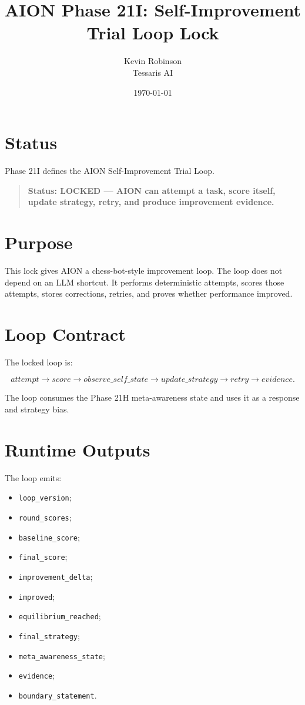 \documentclass[11pt,a4paper]{article}
\title{\textbf{AION Phase 21I: Self-Improvement Trial Loop Lock}}
\author{Kevin Robinson\\Tessaris AI}
\date{\today}
\begin{document}
\maketitle

\section{Status}

Phase 21I defines the AION Self-Improvement Trial Loop.

\begin{quote}
\textbf{Status: LOCKED --- AION can attempt a task, score itself, update strategy, retry, and produce improvement evidence.}
\end{quote}

\section{Purpose}

This lock gives AION a chess-bot-style improvement loop. The loop does not depend on an LLM shortcut. It performs deterministic attempts, scores those attempts, stores corrections, retries, and proves whether performance improved.

\section{Loop Contract}

The locked loop is:

\[
attempt \rightarrow score \rightarrow observe\_self\_state \rightarrow update\_strategy \rightarrow retry \rightarrow evidence.
\]

The loop consumes the Phase 21H meta-awareness state and uses it as a response and strategy bias.

\section{Runtime Outputs}

The loop emits:

\begin{itemize}
  \item \texttt{loop\_version};
  \item \texttt{round\_scores};
  \item \texttt{baseline\_score};
  \item \texttt{final\_score};
  \item \texttt{improvement\_delta};
  \item \texttt{improved};
  \item \texttt{equilibrium\_reached};
  \item \texttt{final\_strategy};
  \item \texttt{meta\_awareness\_state};
  \item \texttt{evidence};
  \item \texttt{boundary\_statement}.
\end{itemize}
\end{document}
